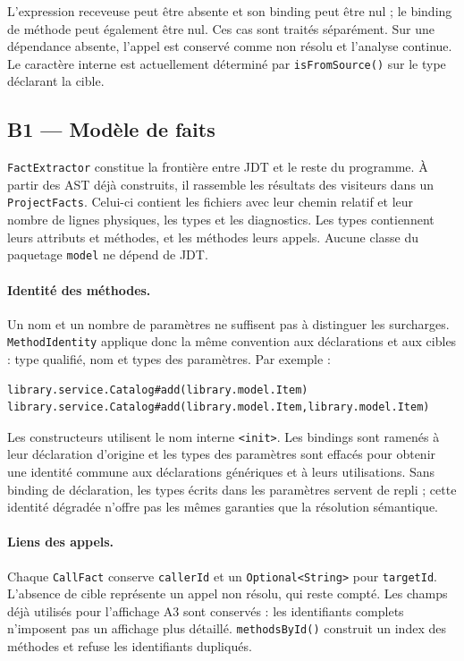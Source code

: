 \documentclass[11pt,a4paper]{article}
\newcommand{\code}[1]{\texttt{#1}}
\begin{document}
L'expression receveuse peut être absente et son binding peut être nul ; le binding de méthode peut également être nul. Ces cas sont traités séparément. Sur une dépendance absente, l'appel est conservé comme non résolu et l'analyse continue. Le caractère interne est actuellement déterminé par \code{isFromSource()} sur le type déclarant la cible.

\subsection{B1 --- Modèle de faits}
\code{FactExtractor} constitue la frontière entre JDT et le reste du programme. À partir des AST déjà construits, il rassemble les résultats des visiteurs dans un \code{ProjectFacts}. Celui-ci contient les fichiers avec leur chemin relatif et leur nombre de lignes physiques, les types et les diagnostics. Les types contiennent leurs attributs et méthodes, et les méthodes leurs appels. Aucune classe du paquetage \code{model} ne dépend de JDT.

\paragraph{Identité des méthodes.}
Un nom et un nombre de paramètres ne suffisent pas à distinguer les surcharges. \code{MethodIdentity} applique donc la même convention aux déclarations et aux cibles : type qualifié, nom et types des paramètres. Par exemple :
\begin{lstlisting}
library.service.Catalog#add(library.model.Item)
library.service.Catalog#add(library.model.Item,library.model.Item)
\end{lstlisting}
Les constructeurs utilisent le nom interne \code{<init>}. Les bindings sont ramenés à leur déclaration d'origine et les types des paramètres sont effacés pour obtenir une identité commune aux déclarations génériques et à leurs utilisations. Sans binding de déclaration, les types écrits dans les paramètres servent de repli ; cette identité dégradée n'offre pas les mêmes garanties que la résolution sémantique.

\paragraph{Liens des appels.}
Chaque \code{CallFact} conserve \code{callerId} et un \code{Optional<String>} pour \code{targetId}. L'absence de cible représente un appel non résolu, qui reste compté. Les champs déjà utilisés pour l'affichage A3 sont conservés : les identifiants complets n'imposent pas un affichage plus détaillé. \code{methodsById()} construit un index des méthodes et refuse les identifiants dupliqués.
\end{document}
